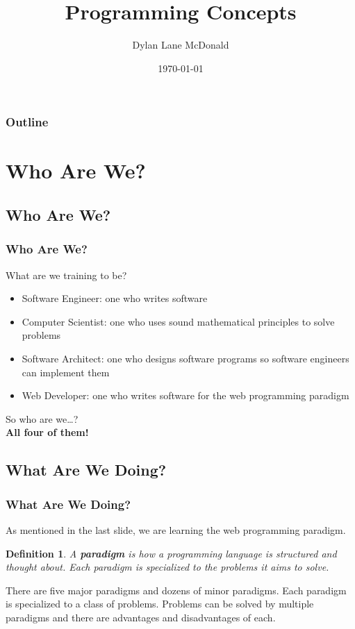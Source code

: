 \documentclass[aspectratio=169]{beamer}
\title{Programming Concepts}
\author{Dylan Lane McDonald}
\institute{CNM STEMulus Center\\Web Development with PHP}
\date{\today}
\newtheorem{defn}{Definition}
\begin{document}
\lstset{language=HTML}
\begin{frame}
\titlepage
\end{frame}

\begin{frame}
\frametitle{Outline}
\tableofcontents
\end{frame}

\section{Who Are We?}
\subsection{Who Are We?}
\begin{frame}
\frametitle{Who Are We?}
What are we training to be?
\begin{itemize}
	\item Software Engineer: one who writes software
	\pause
	\item Computer Scientist: one who uses sound mathematical principles to solve problems
	\pause
	\item Software Architect: one who designs software programs so software engineers can implement them
	\pause
	\item Web Developer: one who writes software for the web programming paradigm
\end{itemize}
\pause
So who are we\dots?
\pause
\mbox{}\\
\textbf{All four of them!}
\end{frame}

\subsection{What Are We Doing?}
\begin{frame}
\frametitle{What Are We Doing?}
As mentioned in the last slide, we are learning the web programming paradigm.
\pause
\begin{defn}
A \textbf{paradigm} is how a programming language is structured and thought about. Each paradigm is specialized to the problems it aims to solve.
\end{defn}
\pause
There are five major paradigms and dozens of minor paradigms. Each paradigm is specialized to a class of problems. Problems can be solved by multiple paradigms and there are advantages and disadvantages of each.
\end{frame}
\end{document}
